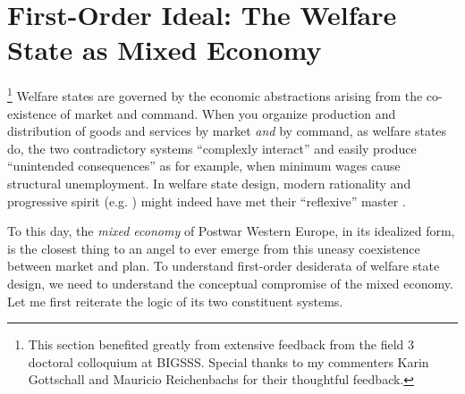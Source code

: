 

\section{First-Order Ideal: The Welfare State as Mixed Economy} \label{sec:mixed-economy}
\footnote{
	This section benefited greatly from extensive feedback from the field 3 doctoral colloquium at \gls{BIGSSS}. 
	Special thanks to my commenters Karin Gottschall and Mauricio Reichenbachs for their thoughtful feedback.
}
Welfare states are governed by the economic abstractions arising from the co-existence of market and command.
When you organize production and distribution of goods and services by market \emph{and} by command, as welfare states do, the two contradictory systems ``complexly interact'' \citep{Perrow-1999-aa} and easily produce ``unintended consequences'' \citep{Merton-1936-aa} as for example, when minimum wages cause structural unemployment. In welfare state design, modern rationality \citep{Weber-1920-aa} and progressive spirit (e.g. \citealt{Offe2010}) might indeed have met their ``reflexive'' master \citep{BeckBonss-2003-aa}. 

To this day, the \emph{mixed economy} of Postwar Western Europe, in its idealized form, is the closest thing to an angel to ever emerge from this uneasy coexistence between market and plan. To understand first-order desiderata of welfare state design, we need to understand the  conceptual compromise of the mixed economy. Let me first reiterate the logic of its two constituent systems.

